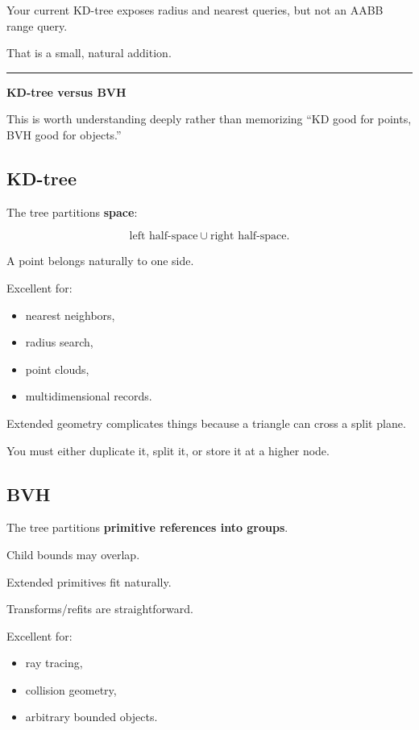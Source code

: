 Your current KD-tree exposes radius and nearest queries, but not an AABB range query.

That is a small, natural addition.

\begin{center}\rule{0.5\linewidth}{0.5pt}\end{center}

\textbf{KD-tree versus BVH}

This is worth understanding deeply rather than memorizing ``KD good for points, BVH good for objects.''

\subsection{KD-tree}\label{06-engine-ii-ch029-kd-tree}

The tree partitions \textbf{space}:

\[
\text{left half-space}
\cup
\text{right half-space}.
\]

A point belongs naturally to one side.

Excellent for:

\begin{itemize}
\tightlist
\item
  nearest neighbors,
\item
  radius search,
\item
  point clouds,
\item
  multidimensional records.
\end{itemize}

Extended geometry complicates things because a triangle can cross a split plane.

You must either duplicate it, split it, or store it at a higher node.

\subsection{BVH}\label{06-engine-ii-ch029-bvh}

The tree partitions \textbf{primitive references into groups}.

Child bounds may overlap.

Extended primitives fit naturally.

Transforms/refits are straightforward.

Excellent for:

\begin{itemize}
\tightlist
\item
  ray tracing,
\item
  collision geometry,
\item
  arbitrary bounded objects.
\end{itemize}

